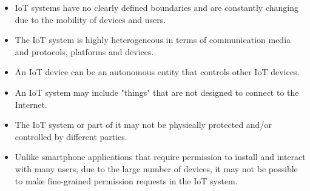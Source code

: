 \documentclass[conference]{IEEEtran}
\begin{document}
\begin{itemize}
\item IoT systems have no clearly defined boundaries and are constantly changing due to the mobility of devices and users.
\item The IoT system is highly heterogeneous in terms of communication media and protocols, platforms and devices.
\item An IoT device can be an autonomous entity that controls other IoT devices.
\item An IoT system may include "things" that are not designed to connect to the Internet.
\item The IoT system or part of it may not be physically protected and/or controlled by different parties.
\item Unlike smartphone applications that require permission to install and interact with many users, due to the large number of devices, it may not be possible to make fine-grained permission requests in the IoT system.
\end{itemize}
\end{document}
